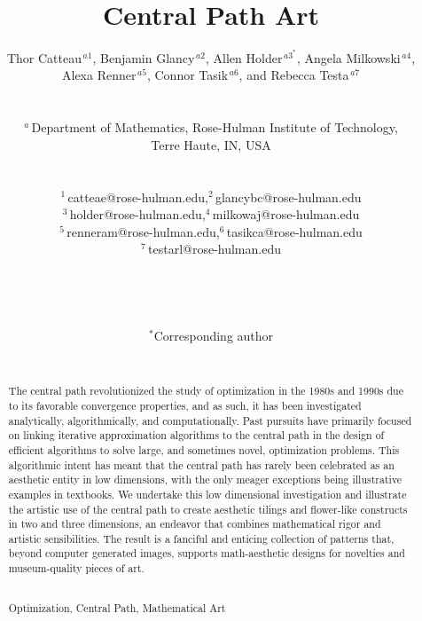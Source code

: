 \documentclass{article}
\begin{document}
\title{Central Path Art}

\author{Thor Catteau$^{\,a1}$,
    Benjamin Glancy$^{\, a2}$,
    Allen Holder$^{\, a3^*}$, 
    Angela Milkowski$^{\, a4}$, \\[4pt]
    Alexa Renner$^{\, a5}$,
    Connor Tasik$^{\, a6}$, and
    Rebecca Testa$^{\, a7}$
    \\ \\
\parbox{.9\textwidth}{\footnotesize
$^a\,$Department of Mathematics, Rose-Hulman Institute of Technology, \\
        \hspace*{6pt}Terre Haute, IN, USA} \\[8pt]
\parbox{.9\textwidth}{\footnotesize
        \hspace*{-10pt}
        \begin{tabular}{ll}
        $^1\,$catteae@rose-hulman.edu, &
        $^2\,$glancybc@rose-hulman.edu \\[2pt]
        $^3\,$holder@rose-hulman.edu, &
        $^4\,$milkowaj@rose-hulman.edu \\[2pt]
        $^5\,$renneram@rose-hulman.edu, &
        $^6\,$tasikca@rose-hulman.edu \\[2pt]
        $^7\,$testarl@rose-hulman.edu 
        \end{tabular} \\
        }  \\[10pt]
\parbox{0.9\textwidth}{\footnotesize
$^*$Corresponding author} \\[0pt]
}

\maketitle

\begin{abstract}

The central path revolutionized the study of
optimization in the 1980s and 1990s due to its favorable
convergence properties, and as such, it has been
investigated analytically, algorithmically, and 
computationally. Past pursuits have primarily focused
on linking iterative approximation algorithms to the
central path in the design of efficient algorithms
to solve large, and sometimes novel, optimization problems. 
This algorithmic intent has meant that the central
path has rarely been celebrated as an aesthetic entity in 
low dimensions, with the only meager exceptions being illustrative
examples in textbooks. We undertake this low dimensional
investigation and illustrate the artistic use of the central path to
create aesthetic tilings and flower-like constructs in two and three 
dimensions, an endeavor that combines mathematical rigor and
artistic sensibilities. The result is a fanciful and enticing
collection of patterns that, beyond computer generated images, 
supports math-aesthetic designs for novelties and museum-quality 
pieces of art. \\\

 Optimization, Central Path,
    Mathematical Art \\[4pt]

\end{abstract}
\end{document}
